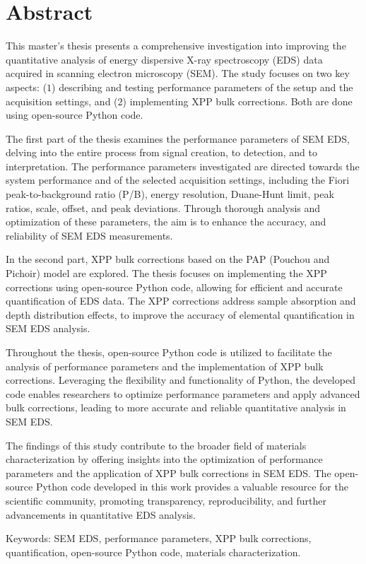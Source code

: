 \chapter*{Abstract}

\label{ch:abstract}


This master's thesis presents a comprehensive investigation into improving the quantitative analysis of energy dispersive X-ray spectroscopy (EDS) data acquired in scanning electron microscopy (SEM). 
The study focuses on two key aspects: ($1$) describing and testing performance parameters of the setup and the acquisition settings, and ($2$) implementing XPP bulk corrections.
Both are done using open-source Python code.

The first part of the thesis examines the performance parameters of SEM EDS, delving into the entire process from signal creation, to detection, and to interpretation. 
The performance parameters investigated are directed towards the system performance and of the selected acquisition settings, including the Fiori peak-to-background ratio (P/B), energy resolution, Duane-Hunt limit, peak ratios, scale, offset, and peak deviations. 
Through thorough analysis and optimization of these parameters, the aim is to enhance the accuracy, and reliability of SEM EDS measurements.

In the second part, XPP bulk corrections based on the PAP (Pouchou and Pichoir) model are explored. 
The thesis focuses on implementing the XPP corrections using open-source Python code, allowing for efficient and accurate quantification of EDS data. 
The XPP corrections address sample absorption and depth distribution effects, to improve the accuracy of elemental quantification in SEM EDS analysis.

Throughout the thesis, open-source Python code is utilized to facilitate the analysis of performance parameters and the implementation of XPP bulk corrections. 
Leveraging the flexibility and functionality of Python, the developed code enables researchers to optimize performance parameters and apply advanced bulk corrections, leading to more accurate and reliable quantitative analysis in SEM EDS.

The findings of this study contribute to the broader field of materials characterization by offering insights into the optimization of performance parameters and the application of XPP bulk corrections in SEM EDS. 
The open-source Python code developed in this work provides a valuable resource for the scientific community, promoting transparency, reproducibility, and further advancements in quantitative EDS analysis.

Keywords: SEM EDS, performance parameters, XPP bulk corrections, quantification, open-source Python code, materials characterization.
